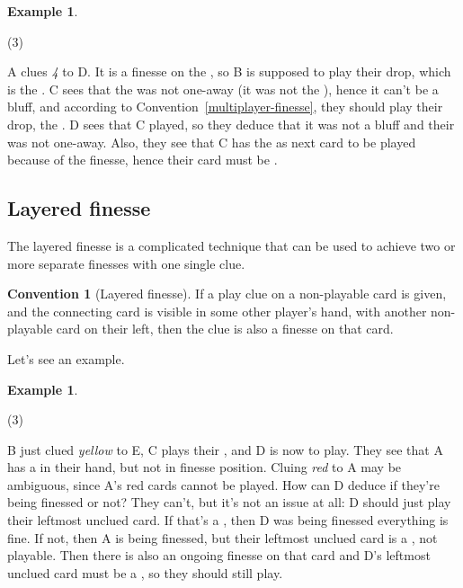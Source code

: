 \documentclass[a4paper]{article}
\theoremstyle{plain}
\theoremstyle{definition}
\newtheorem{example}[theorem]{Example}
\newtheorem{convention}[theorem]{Convention}
\begin{document}
\begin{example}
	\hfill
	\begin{tasks}(3)
		\task[+]      
		\task[A]    
		\task[B]    
		\task[C]    
		\task[D]    
		\task[E]    
	\end{tasks}
	
	A clues \textit{4} to D. It is a finesse on the , so B is supposed to play their drop, which is the . C sees that the  was not one-away (it was not the ), hence it can't be a bluff, and according to Convention~\ref{multiplayer-finesse}, they should play their drop, the . D sees that C played, so they deduce that it was not a bluff and their  was not one-away. Also, they see that C has the  as next card to be played because of the finesse, hence their card must be .
\end{example}

\subsection{Layered finesse}

The layered finesse is a complicated technique that can be used to achieve two or more separate finesses with one single clue.

\begin{convention}[Layered finesse]
	\label{layered-finesse}
	If a play clue on a non-playable card is given, and the connecting card is visible in some other player's hand, with another non-playable card on their left, then the clue is also a finesse on that card.
\end{convention}

Let's see an example.

\begin{example}
	\hfill	
	\begin{tasks}(3)
		\task[+]      
		\task[A]    
		\task[B]    
		\task[C]    
		\task[D]    
		\task[E]    
	\end{tasks}
	
	B just clued \textit{yellow} to E, C plays their , and D is now to play. They see that A has a  in their hand, but not in finesse position. Cluing \textit{red} to A may be ambiguous, since A's red cards cannot be played. How can D deduce if they're being finessed or not? They can't, but it's not an issue at all: D should just play their leftmost unclued card. If that's a , then D was being finessed everything is fine. If not, then A is being finessed, but their leftmost unclued card is a , not playable. Then there is also an ongoing finesse on that card and D's leftmost unclued card must be a , so they should still play.	
\end{example}
\end{document}
